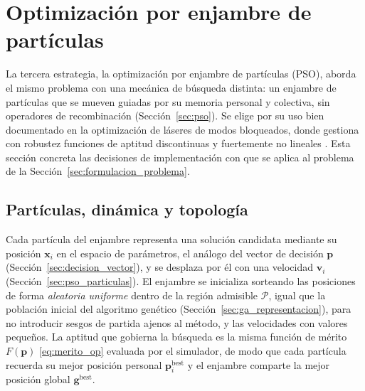 
\section{Optimización por enjambre de partículas}
\label{sec:pso_impl}

La tercera estrategia, la optimización por enjambre de partículas (PSO), aborda el mismo problema con una mecánica de búsqueda distinta: un enjambre de partículas que se mueven guiadas por su memoria personal y colectiva, sin operadores de recombinación (Sección~\ref{sec:pso}). Se elige por su uso bien documentado en la optimización de láseres de modos bloqueados, donde gestiona con robustez funciones de aptitud discontinuas y fuertemente no lineales \cite{Kokhanovskiy2021,Nsoungui2026}. Esta sección concreta las decisiones de implementación con que se aplica al problema de la Sección~\ref{sec:formulacion_problema}.

\subsection{Partículas, dinámica y topología}
\label{sec:pso_dinamica_impl}

Cada partícula del enjambre representa una solución candidata mediante su posición
$\mathbf{x}_i$ en el espacio de parámetros, el análogo del vector de decisión
$\mathbf{p}$ (Sección~\ref{sec:decision_vector}), y se desplaza por él con una
velocidad $\mathbf{v}_i$ (Sección~\ref{sec:pso_particulas}). El enjambre se
inicializa sorteando las posiciones de forma \emph{aleatoria uniforme} dentro de la
región admisible $\mathcal{P}$, igual que la población inicial del algoritmo genético
(Sección~\ref{sec:ga_representacion}), para no introducir sesgos de partida ajenos al
método, y las velocidades con valores pequeños. La aptitud que gobierna la búsqueda
es la misma función de mérito $F(\mathbf{p})$ \eqref{eq:merito_op} evaluada por el
simulador, de modo que cada partícula recuerda su mejor posición personal
$\mathbf{p}_i^{\text{best}}$ y el enjambre comparte la mejor posición global
$\mathbf{g}^{\text{best}}$.

